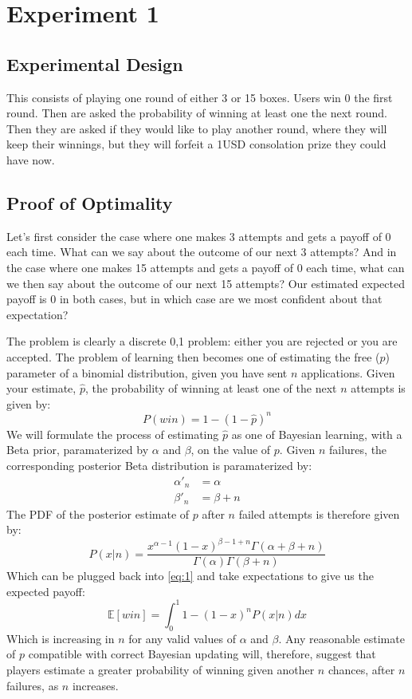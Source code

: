 \documentclass[a4paper,12pt]{article}
\begin{document}
\section{Experiment 1}

\subsection{ Experimental Design }

This consists of playing one round of either 3 or 15 boxes. Users win 0 the first round. Then are asked the probability of winning at least one the next round. Then they are asked if they would like to play another round, where they will keep their winnings, but they will forfeit a 1USD consolation prize they could have now.

\subsection{ Proof of Optimality }

Let's first consider the case where one makes 3 attempts and gets a payoff of 0 each time. What can we say about the outcome of our next 3 attempts? And in the case where one makes 15 attempts and gets a payoff of 0 each time, what can we then say about the outcome of our next 15 attempts? Our estimated expected payoff is 0 in both cases, but in which case are we most confident about that expectation?

The problem is clearly a discrete 0,1 problem: either you are rejected or you are accepted. The problem of learning then becomes one of estimating the free ($p$) parameter of a binomial distribution, given you have sent $n$ applications. Given your estimate, $\hat{p}$, the probability of winning at least one of the next $n$ attempts is given by:
\begin{equation} \label {eq:1}
  P(win) = 1 - (1-\hat{p})^n
\end{equation}
%
We will formulate the process of estimating $\hat{p}$ as one of Bayesian learning, with a Beta prior, paramaterized by $\alpha$ and $\beta$, on the value of $p$. Given $n$ failures, the corresponding posterior Beta distribution is paramaterized by:
\begin{align*}
  \alpha'_{n} &= \alpha \\
  \beta'_{n} &= \beta + n
\end{align*}
The PDF of the posterior estimate of $p$ after $n$ failed attempts is therefore given by:
$$
P(x | n) = \frac{ x^{\alpha - 1}(1 - x)^{\beta - 1 + n} \Gamma(\alpha + \beta + n)}{\Gamma(\alpha) \Gamma(\beta + n)}
$$
Which can be plugged back into \ref{eq:1} and take expectations to give us the expected payoff:
$$
\mathbb{E}[win] = \int_0^1 1 - \left( 1 - x \right)^n P(x | n) dx
$$
Which is increasing in $n$ for any valid values of $\alpha$ and $\beta$. Any reasonable estimate of $p$ compatible with correct Bayesian updating will, therefore, suggest that players estimate a greater probability of winning given another $n$ chances, after $n$ failures, as $n$ increases.
\end{document}
